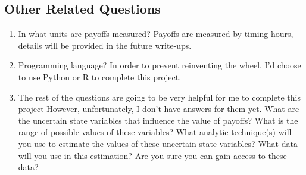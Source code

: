 \documentclass[
]{article}
\providecommand{\tightlist}{%
  \setlength{\itemsep}{0pt}\setlength{\parskip}{0pt}}
\begin{document}
\hypertarget{other-related-questions}{%
\subsection{Other Related Questions}\label{other-related-questions}}

\begin{enumerate}
\def\labelenumi{\arabic{enumi}.}
\tightlist
\item
  In what units are payoffs measured? \newline Payoffs are measured by
  timing hours, details will be provided in the future write-ups.
  \newline 
\item
  Programming language? \newline In order to prevent reinventing the
  wheel, I'd choose to use Python or R to complete this project.
  \newline
\item
  The rest of the questions are going to be very helpful for me to
  complete this project However, unfortunately, I don't have answers for
  them yet. \newline What are the uncertain state variables that
  influence the value of payoffs? \newline What is the range of possible
  values of these variables? \newline     What analytic technique(s)
  will you use to estimate the values of these uncertain state
  variables? \newline What data will you use in this estimation? Are you
  sure you can gain access to these data?
\end{enumerate}
\end{document}
